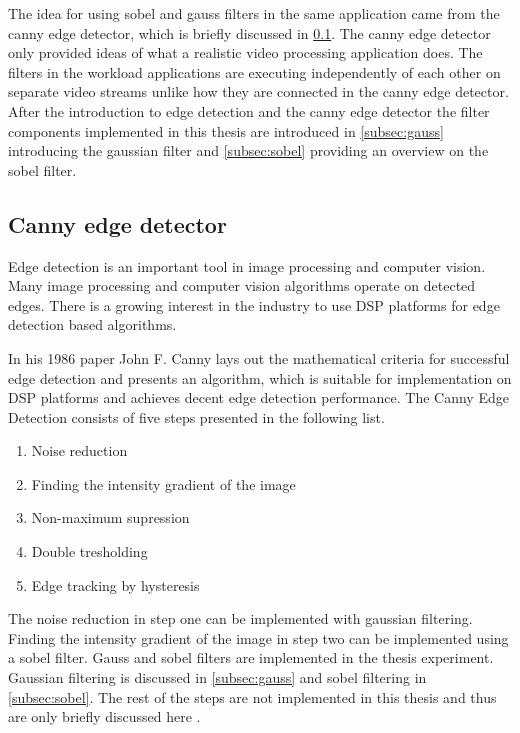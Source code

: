 The idea for using sobel and gauss filters in the same application came from
the canny edge detector, which is briefly discussed in \ref{subsec:canny}. The
canny edge detector only provided ideas of what a realistic video processing
application does. The filters in the workload applications are executing
independently of each other on separate video streams unlike how they are
connected in the canny edge detector. After the introduction to edge detection
and the canny edge detector the filter components implemented in this thesis are
introduced in \ref{subsec:gauss} introducing the gaussian filter and
\ref{subsec:sobel} providing an overview on the sobel filter.\\


\subsection{Canny edge detector}
\label{subsec:canny}
Edge detection is an important tool in image processing and computer vision.
Many image processing and computer vision algorithms operate on detected edges.
There is a growing interest in the industry to use DSP platforms for edge
detection based algorithms.

In his 1986 paper John F. Canny \cite{canny1986computational} lays out the
mathematical criteria for successful edge detection and presents an algorithm,
which is suitable for implementation on DSP platforms and achieves decent edge
detection performance. The Canny Edge Detection consists of five steps
presented in the following list.

\begin{enumerate}
    \item{Noise reduction}
    \item{Finding the intensity gradient of the image}
    \item{Non-maximum supression}
    \item{Double tresholding}
    \item{Edge tracking by hysteresis}
\end{enumerate}

The noise reduction in step one can be implemented with gaussian filtering.
Finding the intensity gradient of the image in step two can be implemented using
a sobel filter. Gauss and sobel filters are implemented in the thesis
experiment. Gaussian filtering is discussed in \ref{subsec:gauss} and sobel
filtering in \ref{subsec:sobel}. The rest of the steps are not implemented in
this thesis and thus are only briefly discussed here .

